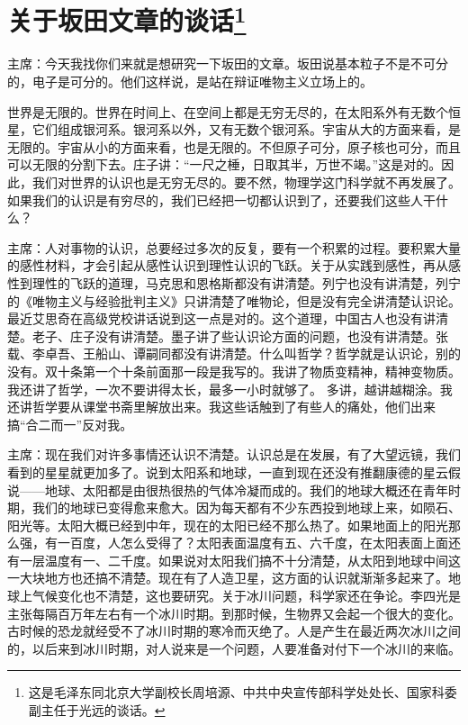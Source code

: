 \section[关于坂田文章的谈话（一九六四年八月二十四日）]{关于坂田文章的谈话\footnote{这是毛泽东同北京大学副校长周培源、中共中央宣传部科学处处长、国家科委副主任于光远的谈话。}}

主席：今天我找你们来就是想研究一下坂田的文章。坂田说基本粒子不是不可分的，电子是可分的。他们这样说，是站在辩证唯物主义立场上的。

世界是无限的。世界在时间上、在空间上都是无穷无尽的，在太阳系外有无数个恒星，它们组成银河系。银河系以外，又有无数个银河系。宇宙从大的方面来看，是无限的。宇宙从小的方面来看，也是无限的。不但原子可分，原子核也可分，而且可以无限的分割下去。庄子讲：“一尺之棰，日取其半，万世不竭。”这是对的。因此，我们对世界的认识也是无穷无尽的。要不然，物理学这门科学就不再发展了。如果我们的认识是有穷尽的，我们已经把一切都认识到了，还要我们这些人干什么？

主席：人对事物的认识，总要经过多次的反复，要有一个积累的过程。要积累大量的感性材料，才会引起从感性认识到理性认识的飞跃。关于从实践到感性，再从感性到理性的飞跃的道理，马克思和恩格斯都没有讲清楚。列宁也没有讲清楚，列宁的《唯物主义与经验批判主义》只讲清楚了唯物论，但是没有完全讲清楚认识论。最近艾思奇在高级党校讲话说到这一点是对的。这个道理，中国古人也没有讲清楚。老子、庄子没有讲清楚。墨子讲了些认识论方面的问题，也没有讲清楚。张载、李卓吾、王船山、谭嗣同都没有讲清楚。什么叫哲学？哲学就是认识论，别的没有。双十条第一个十条前面那一段是我写的。我讲了物质变精神，精神变物质。我还讲了哲学，一次不要讲得太长，最多一小时就够了。 多讲，越讲越糊涂。我还讲哲学要从课堂书斋里解放出来。我这些话触到了有些人的痛处，他们出来搞“合二而一”反对我。

主席：现在我们对许多事情还认识不清楚。认识总是在发展，有了大望远镜，我们看到的星星就更加多了。说到太阳系和地球，一直到现在还没有推翻康德的星云假说——地球、太阳都是由很热很热的气体冷凝而成的。我们的地球大概还在青年时期，我们的地球已变得愈来愈大。因为每天都有不少东西投到地球上来，如陨石、阳光等。太阳大概已经到中年，现在的太阳已经不那么热了。如果地面上的阳光那么强，有一百度，人怎么受得了？太阳表面温度有五、六千度，在太阳表面上面还有一层温度有一、二千度。如果说对太阳我们搞不十分清楚，从太阳到地球中间这一大块地方也还搞不清楚。现在有了人造卫星，这方面的认识就渐渐多起来了。地球上气候变化也不清楚，这也要研究。关于冰川问题，科学家还在争论。李四光是主张每隔百万年左右有一个冰川时期。到那时候，生物界又会起一个很大的变化。古时候的恐龙就经受不了冰川时期的寒冷而灭绝了。人是产生在最近两次冰川之间的，以后来到冰川时期，对人说来是一个问题，人要准备对付下一个冰川的来临。

